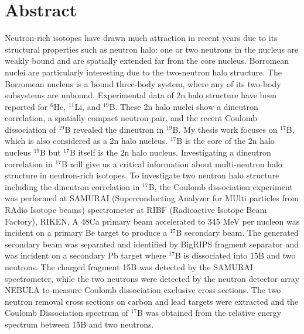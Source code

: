 \documentclass[11pt]{book}
\begin{document}
\chapter*{Abstract}
Neutron-rich isotopes have drawn much attraction in recent years due to its structural properties such as neutron halo: one or two neutrons in the nucleus are weakly bound and are spatially extended far from the core nucleus. Borromean nuclei are particularly interesting due to the two-neutron halo structure. The Borromean nucleus is a bound three-body system, where any of its two-body subsystems are unbound. Experimental data of 2n halo structure have been reported for ${}^{6}$He, ${}^{11}$Li, and ${}^{19}$B. These 2n halo nuclei show a dineutron correlation, a spatially compact neutron pair, and the recent Coulomb dissociation of ${}^{19}$B revealed the dineutron in ${}^{19}$B. My thesis work focuses on ${}^{17}$B, which is also considered as a 2n halo nucleus. ${}^{17}$B is the core of the 2n halo nucleus ${}^{19}$B but ${}^{17}$B itself is the 2n halo nucleus. Investigating a dineutron correlation in ${}^{17}$B will give us a critical information about multi-neutron halo structure in neutron-rich isotopes. \newline
To investigate two neutron halo structure including the dineutron correlation in ${}^{17}$B, the Coulomb dissociation experiment was performed at SAMURAI (Superconducting Analyzer for MUlti particles from RAdio Isotope beams) spectrometer at RIBF (Radioactive Isotope Beam Factory), RIKEN. A 48Ca primary beam accelerated to 345 MeV per nucleon was incident on a primary Be target to produce a ${}^{17}$B secondary beam. The generated secondary beam was separated and identified by BigRIPS fragment separator and was incident on a secondary Pb target where ${}^{17}$B is dissociated into 15B and two neutrons. The charged fragment 15B was detected by the SAMURAI spectrometer, while the two neutrons were detected by the neutron detector array NEBULA to measure Coulomb dissociation exclusive cross sections. The two neutron removal cross sections on carbon and lead targets were extracted and the Coulomb Dissociation spectrum of ${}^{17}$B was obtained from the relative energy spectrum between 15B and two neutrons.

\clearpage

\tableofcontents
\listoffigures
\listoftables

\mainmatter %










\backmatter

\printbibliography
\end{document}
